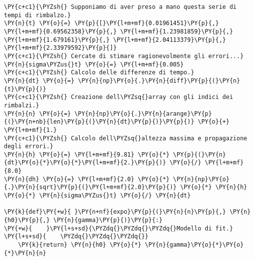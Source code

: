 \begin{Verbatim}[label=\makebox{\href{https://github.com/unipi-physics-labs/lab1-sheets/tree/main/snippy/dad_palla.py}{https://github.com/.../dad\_palla.py}},commandchars=\\\{\}]
\PY{c+c1}{\PYZsh{} Supponiamo di aver preso a mano questa serie di tempi di rimbalzo.}
\PY{n}{t} \PY{o}{=} \PY{p}{[}\PY{l+m+mf}{0.01961451}\PY{p}{,} \PY{l+m+mf}{0.69562358}\PY{p}{,} \PY{l+m+mf}{1.23981859}\PY{p}{,} \PY{l+m+mf}{1.679161}\PY{p}{,} \PY{l+m+mf}{2.04113379}\PY{p}{,} \PY{l+m+mf}{2.33979592}\PY{p}{]}
\PY{c+c1}{\PYZsh{} Cercate di stimare ragionevolmente gli errori...}
\PY{n}{sigma\PYZus{}t} \PY{o}{=} \PY{l+m+mf}{0.005}
\PY{c+c1}{\PYZsh{} Calcolo delle differenze di tempo.}
\PY{n}{dt} \PY{o}{=} \PY{n}{np}\PY{o}{.}\PY{n}{diff}\PY{p}{(}\PY{n}{t}\PY{p}{)}
\PY{c+c1}{\PYZsh{} Creazione dell\PYZsq{}array con gli indici dei rimbalzi.}
\PY{n}{n} \PY{o}{=} \PY{n}{np}\PY{o}{.}\PY{n}{arange}\PY{p}{(}\PY{n+nb}{len}\PY{p}{(}\PY{n}{dt}\PY{p}{)}\PY{p}{)} \PY{o}{+} \PY{l+m+mf}{1.}
\PY{c+c1}{\PYZsh{} Calcolo dell\PYZsq{}altezza massima e propagazione degli errori.}
\PY{n}{h} \PY{o}{=} \PY{l+m+mf}{9.81} \PY{o}{*} \PY{p}{(}\PY{n}{dt}\PY{o}{*}\PY{o}{*}\PY{l+m+mf}{2.}\PY{p}{)} \PY{o}{/} \PY{l+m+mf}{8.0}
\PY{n}{dh} \PY{o}{=} \PY{l+m+mf}{2.0} \PY{o}{*} \PY{n}{np}\PY{o}{.}\PY{n}{sqrt}\PY{p}{(}\PY{l+m+mf}{2.0}\PY{p}{)} \PY{o}{*} \PY{n}{h} \PY{o}{*} \PY{n}{sigma\PYZus{}t} \PY{o}{/} \PY{n}{dt}

\PY{k}{def}\PY{+w}{ }\PY{n+nf}{expo}\PY{p}{(}\PY{n}{n}\PY{p}{,} \PY{n}{h0}\PY{p}{,} \PY{n}{gamma}\PY{p}{)}\PY{p}{:}
\PY{+w}{    }\PY{l+s+sd}{\PYZdq{}\PYZdq{}\PYZdq{}Modello di fit.}
\PY{l+s+sd}{    \PYZdq{}\PYZdq{}\PYZdq{}}
    \PY{k}{return} \PY{n}{h0} \PY{o}{*} \PY{n}{gamma}\PY{o}{*}\PY{o}{*}\PY{n}{n}


\end{Verbatim}
